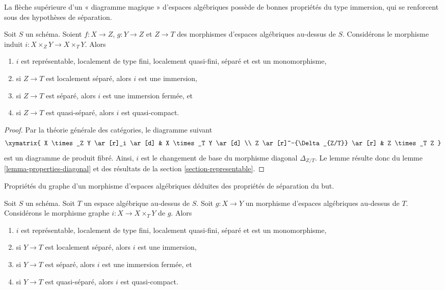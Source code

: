 \begin{lemma}
\label{lemma-fibre-product-after-map}
\begin{slogan}
La flèche supérieure d'un « diagramme magique » d'espaces algébriques possède
de bonnes propriétés du type immersion, qui se renforcent
sous des hypothèses de séparation.
\end{slogan}
Soit $S$ un schéma. Soient $f : X \to Z$, $g : Y \to Z$ et $Z \to T$
des morphismes d'espaces algébriques au-dessus de $S$. Considérons le morphisme induit
$i : X \times_Z Y \to X \times_T Y$. Alors
\begin{enumerate}
\item $i$ est représentable, localement de type fini, localement quasi-fini,
séparé et est un monomorphisme,
\item si $Z \to T$ est localement séparé, alors $i$ est une immersion,
\item si $Z \to T$ est séparé, alors $i$ est une immersion fermée, et
\item si $Z \to T$ est quasi-séparé, alors $i$ est quasi-compact.
\end{enumerate}
\end{lemma}

\begin{proof}
Par la théorie générale des catégories, le diagramme suivant
$$
\xymatrix{
X \times_Z Y \ar[r]_i \ar[d] & X \times_T Y \ar[d] \\
Z \ar[r]^-{\Delta_{Z/T}} \ar[r] & Z \times_T Z
}
$$
est un diagramme de produit fibré. Ainsi, $i$ est le changement de base du
morphisme diagonal $\Delta_{Z/T}$. Le lemme résulte donc
du lemme \ref{lemma-properties-diagonal} et des résultats de la
section \ref{section-representable}.
\end{proof}

\begin{lemma}
\label{lemma-semi-diagonal}
\begin{slogan}
Propriétés du graphe d'un morphisme d'espaces algébriques
déduites des propriétés de séparation du but.
\end{slogan}
Soit $S$ un schéma. Soit $T$ un espace algébrique au-dessus de $S$.
Soit $g : X \to Y$ un morphisme d'espaces algébriques au-dessus de $T$.
Considérons le morphisme graphe $i : X \to X \times_T Y$ de $g$. Alors
\begin{enumerate}
\item $i$ est représentable, localement de type fini, localement quasi-fini,
séparé et est un monomorphisme,
\item si $Y \to T$ est localement séparé, alors $i$ est une immersion,
\item si $Y \to T$ est séparé, alors $i$ est une immersion fermée, et
\item si $Y \to T$ est quasi-séparé, alors $i$ est quasi-compact.
\end{enumerate}
\end{lemma}

